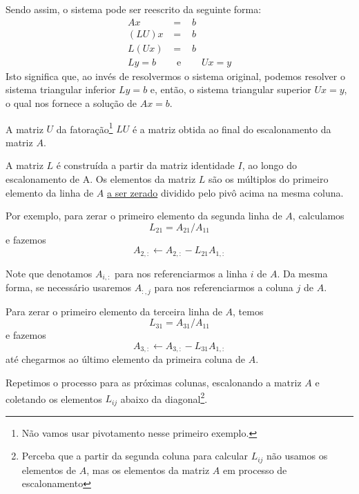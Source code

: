 Sendo assim, o sistema pode ser reescrito da seguinte forma:
\begin{eqnarray}
  Ax &=&b \\
  (LU)x &=&b \\
  L(Ux) &=&b \\
  L y = b \quad & \text{ e }& \quad Ux=y
\end{eqnarray}
Isto significa que, ao invés de resolvermos o sistema original, podemos resolver o sistema triangular inferior $Ly=b$ e, então, o sistema triangular superior $Ux = y$, o qual nos fornece a solução de $Ax = b$.

A matriz $U$ da fatoração\footnote{Não vamos usar pivotamento nesse primeiro exemplo.} $LU$ é a matriz obtida ao final do escalonamento da matriz $A$.

A matriz $L$ é construída  a partir da matriz identidade $I$, ao longo do escalonamento de A. Os elementos da matriz $L$ são os múltiplos do primeiro elemento da linha de $A$ \underline{a ser zerado} dividido pelo pivô acima na mesma coluna.

Por exemplo, para zerar o primeiro elemento da segunda linha de $A$, calculamos
\begin{equation} L_{21} = A_{21}/A_{11} \end{equation}
e fazemos
\begin{equation} A_{2,:} \leftarrow A_{2,:} - L_{21}A_{1,:} \end{equation}

Note que denotamos $A_{i,:}$ para nos referenciarmos a linha $i$ de $A$. Da mesma forma, se necessário usaremos $A_{:,j}$ para nos referenciarmos a coluna $j$ de $A$.

Para zerar o primeiro elemento da terceira linha de $A$, temos
\begin{equation} L_{31}=A_{31}/A_{11} \end{equation}
e fazemos
\begin{equation} A_{3,:} \leftarrow A_{3,:} - L_{31}A_{1,:} \end{equation}
até chegarmos ao último elemento da primeira coluna de $A$.

Repetimos o processo para as próximas colunas, escalonando a matriz $A$ e coletando os elementos $L_{ij}$ abaixo da diagonal\footnote{Perceba que a partir da segunda coluna para calcular $L_{ij}$ não usamos os elementos de $A$, mas os elementos da matriz $A$ em processo de escalonamento}.

